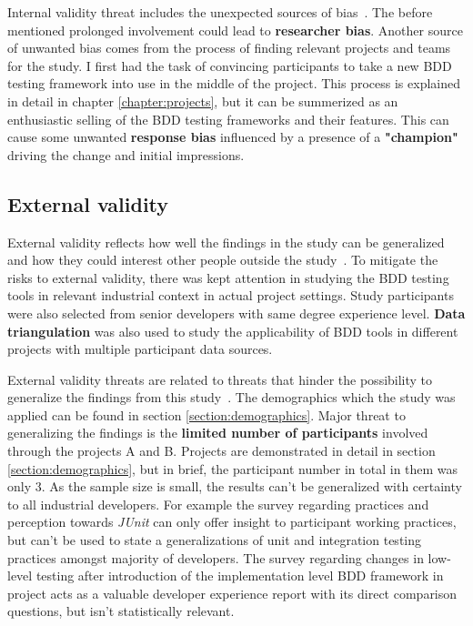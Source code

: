 Internal validity threat includes the unexpected sources of bias~\cite{kitchenham2002preliminary}. The before mentioned
prolonged involvement could lead to \textbf{researcher bias}.
Another source of unwanted bias comes from the process of finding relevant projects and teams for the study.
I first had the task of convincing participants to take a new BDD testing framework into use in the middle of the
project. This process is explained in detail in chapter \ref{chapter:projects}, but it can be summerized as an enthusiastic selling of the
BDD testing frameworks and their features. This can cause some unwanted \textbf{response bias} influenced by a presence
of a \textbf{"champion"}~\cite{kitchenham2002preliminary} driving the change and initial impressions.

\subsection{External validity}
External validity reflects how well the findings in the study can be generalized and how they could interest other people
outside the study~\cite{runeson2012case}. To mitigate the risks to external validity, there was kept attention in
studying the BDD testing tools in relevant industrial context in actual project settings. Study participants were also selected from senior
developers with same degree experience level. \textbf{Data triangulation} was also used to study the applicability of BDD
tools in different projects with multiple participant data sources.

External validity threats are related to threats that hinder the possibility to generalize the findings from this study~\cite{runeson2012case}.
The demographics which the study was applied can be found in section \ref{section:demographics}. Major threat to generalizing the findings
is the \textbf{limited number of participants} involved through the projects A and B. Projects are demonstrated in detail in section \ref{section:demographics},
but in brief, the participant number in total in them was only 3. As the sample size is small, the results can't be generalized
with certainty to all industrial developers. For example the survey regarding practices and perception towards \textit{JUnit} can
only offer insight to participant working practices, but can't be used to state a generalizations of unit and integration
testing practices amongst majority of developers.
The survey regarding changes in low-level testing after introduction of the implementation level BDD framework in project acts
as a valuable developer experience report with its direct comparison questions, but isn't statistically relevant.

